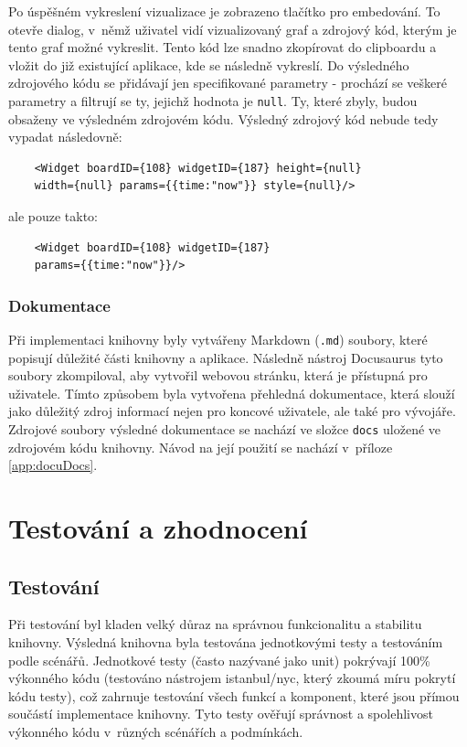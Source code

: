 \documentclass[czech, bc, kiv, he, iso690numb]{fasthesis}
\begin{document}
Po úspěšném vykreslení vizualizace je zobrazeno tlačítko pro embedování. To otevře dialog, v~němž uživatel vidí vizualizovaný graf a zdrojový kód, kterým je tento graf možné vykreslit.
Tento kód lze snadno zkopírovat do clipboardu a vložit do již existující aplikace, kde se následně vykreslí. Do výsledného zdrojového kódu se přidávají jen specifikované parametry -
prochází se veškeré parametry a filtrují se ty, jejichž hodnota je \texttt{null}. Ty, které zbyly, budou obsaženy ve výsledném zdrojovém kódu. Výsledný zdrojový kód nebude tedy vypadat následovně:
\begin{lstlisting}
	<Widget boardID={108} widgetID={187} height={null}
	width={null} params={{time:"now"}} style={null}/>
\end{lstlisting}
ale pouze takto:
\begin{lstlisting}
	<Widget boardID={108} widgetID={187} 
	params={{time:"now"}}/>
\end{lstlisting}

\subsection{Dokumentace}

Při implementaci knihovny byly vytvářeny Markdown (\texttt{.md}) soubory, které popisují důležité části knihovny a aplikace. Následně nástroj Docusaurus tyto soubory zkompiloval,
aby vytvořil webovou stránku, která je přístupná pro uživatele. Tímto způsobem byla vytvořena přehledná dokumentace, která slouží jako důležitý zdroj informací nejen pro koncové uživatele,
ale také pro vývojáře. Zdrojové soubory výsledné dokumentace se nachází ve složce \texttt{docs} uložené ve zdrojovém kódu knihovny. Návod na její použití se nachází v~příloze \ref{app:docuDocs}.

\chapter{Testování a zhodnocení}
\section{Testování}
\label{sect:testovani}
Při testování byl kladen velký důraz na správnou funkcionalitu a stabilitu knihovny. Výsledná knihovna byla testována jednotkovými testy a testováním podle
scénářů. Jednotkové testy (často nazývané jako unit) pokrývají 100\% výkonného kódu (testováno nástrojem istanbul/nyc, který zkoumá míru pokrytí kódu testy), což zahrnuje testování všech funkcí a komponent, 
které jsou přímou součástí implementace knihovny.
Tyto testy ověřují správnost a spolehlivost výkonného kódu v~různých scénářích a podmínkách.
\end{document}

